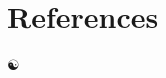 \documentclass[a4paper,11pt]{article}
\begin{document}

\newpage


\section{References}

\begingroup
\renewcommand{\section}[2]{}%


\begin{center}
\vspace{1cm}
\(\yinyang\)
\end{center}
\end{document}
